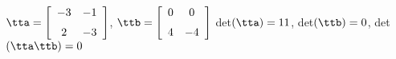 {$\tta = \left[ \begin {array}{cc} -3&-1\\\noalign{\medskip}2&-3\end {array}
 \right] $, 
 \quad
$\ttb = \left[ \begin {array}{cc} 0&0\\\noalign{\medskip}4&-4\end {array}
 \right]$}
{det$(\tta)=11$, det$(\ttb)=0$, det$(\tta\ttb)=0$}






  

